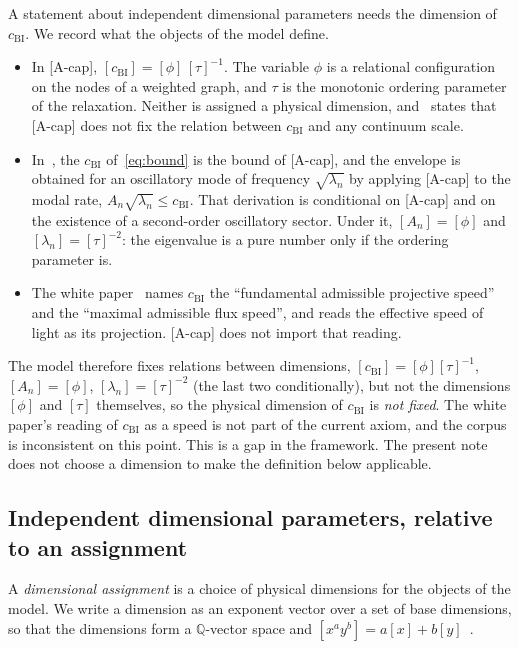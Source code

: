 \documentclass[11pt,a4paper]{article}
\begin{document}
    A statement about independent dimensional parameters needs the dimension of~$c_{\mathrm{BI}}$.
    We record what the objects of the model define.
    \begin{itemize}
      \item In [A-cap], $[c_{\mathrm{BI}}]=[\phi]\,[\tau]^{-1}$.
        The variable $\phi$ is a relational configuration on the nodes of a weighted graph, and $\tau$ is the
        monotonic ordering parameter of the relaxation.
        Neither is assigned a physical dimension, and~\cite{Beau2026c} states that [A-cap] does not fix the
        relation between $c_{\mathrm{BI}}$ and any continuum scale.
      \item In~\cite{Beau2026a24}, the $c_{\mathrm{BI}}$ of~\eqref{eq:bound} is the bound of [A-cap], and the
        envelope is obtained for an oscillatory mode of frequency $\sqrt{\lambda_n}$ by applying [A-cap] to the
        modal rate, $A_n\sqrt{\lambda_n}\le c_{\mathrm{BI}}$.
        That derivation is conditional on [A-cap] and on the existence of a second-order oscillatory sector.
        Under it, $[A_n]=[\phi]$ and $[\lambda_n]=[\tau]^{-2}$: the eigenvalue is a pure number only if the
        ordering parameter is.
      \item The white paper~\cite{Cosmochrony} names $c_{\mathrm{BI}}$ the ``fundamental admissible projective
        speed'' and the ``maximal admissible flux speed'', and reads the effective speed of light as its
        projection.
        [A-cap] does not import that reading.
    \end{itemize}
    The model therefore fixes relations between dimensions,
    $[c_{\mathrm{BI}}]=[\phi][\tau]^{-1}$, $[A_n]=[\phi]$, $[\lambda_n]=[\tau]^{-2}$ (the last two conditionally), but
    not the dimensions $[\phi]$ and $[\tau]$ themselves, so the physical dimension of $c_{\mathrm{BI}}$ is
    \emph{not fixed}.
    The white paper's reading of $c_{\mathrm{BI}}$ as a speed is not part of the current axiom, and the corpus is
    inconsistent on this point.
    This is a gap in the framework.
    The present note does not choose a dimension to make the definition below applicable.

  \subsection{Independent dimensional parameters, relative to an assignment}

    A \emph{dimensional assignment} is a choice of physical dimensions for the objects of the model.
    We write a dimension as an exponent vector over a set of base dimensions, so that the dimensions form a
    $\mathbb{Q}$-vector space and $[x^a y^b]=a[x]+b[y]$~\cite{Buckingham1914,Bridgman1922}.
\end{document}
